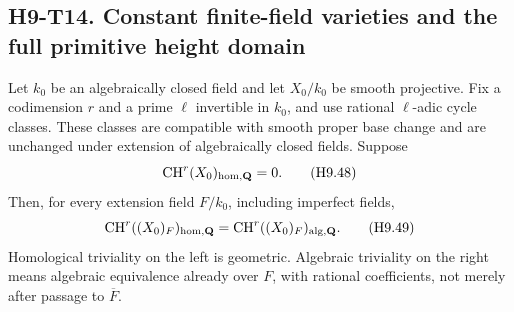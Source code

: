 
\subsection*{H9-T14. Constant finite-field varieties and the full primitive height domain}

\begin{lemma}\label{h9:spread}
Let $k_0$ be an algebraically closed field and let $X_0/k_0$ be
smooth projective. Fix a codimension $r$ and a prime $\ell$ invertible
in $k_0$, and use rational $\ell$-adic cycle classes. These classes are
compatible with smooth proper base change and are unchanged under
extension of algebraically closed fields.
Suppose
\[
 \operatorname{CH}^r(X_0)_{\rm hom,\mathbf Q}=0.
                                                               \tag{H9.48}
\]
Then, for every extension field $F/k_0$, including imperfect fields,
\[
 \operatorname{CH}^r((X_0)_F)_{\rm hom,\mathbf Q}
       =\operatorname{CH}^r((X_0)_F)_{\rm alg,\mathbf Q}.       \tag{H9.49}
\]
Homological triviality on the left is geometric. Algebraic triviality
on the right means algebraic equivalence already over $F$, with
rational coefficients, not merely after passage to $\overline F$.
\end{lemma}

